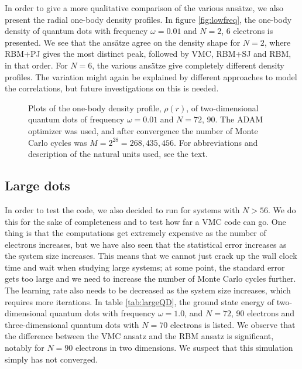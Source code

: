 In order to give a more qualitative comparison of the various ansätze, we also present the radial one-body density profiles. In figure \eqref{fig:lowfreq}, the one-body density of quantum dots with frequency $\omega=0.01$ and $N=2$, 6 electrons is presented. We see that the ansätze agree on the density shape for $N=2$, where RBM+PJ gives the most distinct peak, followed by VMC, RBM+SJ and RBM, in that order. For $N=6$, the various ansätze give completely different density profiles. The variation might again be explained by different approaches to model the correlations, but future investigations on this is needed.

\begin{figure}
	\centering
	\captionsetup[subfigure]{labelformat=empty}
	
	\caption{Plots of the one-body density profile, $\rho(r)$, of two-dimensional quantum dots of frequency $\omega=0.01$ and $N=72$, 90. The ADAM optimizer was used, and after convergence the number of Monte Carlo cycles was $M=2^{28}=268,435,456$. For abbreviations and description of the natural units used, see the text.}
	\label{fig:lowfreq}
\end{figure}

\subsection{Large dots}
In order to test the code, we also decided to run for systems with $N>56$. We do this for the sake of completeness and to test how far a VMC code can go. One thing is that the computations get extremely expensive as the number of electrons increases, but we have also seen that the statistical error increases as the system size increases. This means that we cannot just crack up the wall clock time and wait when studying large systems; at some point, the standard error gets too large and we need to increase the number of Monte Carlo cycles further. The learning rate also needs to be decreased as the system size increases, which requires more iterations. In table \eqref{tab:largeQD}, the ground state energy of two-dimensional quantum dots with frequency $\omega=1.0$, and $N=72$, 90 electrons and three-dimensional quantum dots with $N=70$ electrons is listed. We observe that the difference between the VMC ansatz and the RBM ansatz is significant, notably for $N=90$ electrons in two dimensions. We suspect that this simulation simply has not converged. 

